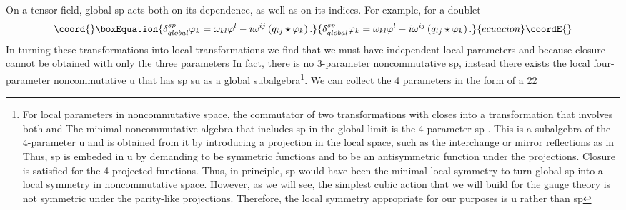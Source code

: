 \documentclass[a4paper,12pt]{article}
\begin{document}
On a tensor field, global sp\coordHE{} acts both on its \coordHE{} dependence, as well as on its indices. For
example, for a doublet 
\begin{equation}\coord{}\boxEquation{
\delta _{global}^{sp}\varphi _{k}=\omega _{kl}\varphi ^{l}-i\omega
^{ij}\left( q_{ij}\star \varphi _{k}\right) .
}{
\delta _{global}^{sp}\varphi _{k}=\omega _{kl}\varphi ^{l}-i\omega
^{ij}\left( q_{ij}\star \varphi _{k}\right) .
}{ecuacion}\coordE{}\end{equation}
In turning these transformations into local transformations we find that we
must have independent local parameters \coordHE{} and \coordHE{} because
closure cannot be obtained with only the three parameters \coordHE{} In fact, there is no 3-parameter
noncommutative sp\coordHE{}, instead there exists the local
four-parameter noncommutative u\coordHE{} that has sp\coordHE{} su\coordHE{} as a global subalgebra\footnote{%
For local parameters in noncommutative space, the commutator of two
transformations with \coordHE{} closes into a transformation that
involves both \coordHE{} and \coordHE{} The minimal noncommutative
algebra that includes sp\coordHE{} in the global limit is the
4-parameter sp\coordHE{} \cite{ncOn}. This is a
subalgebra of the 4-parameter u\coordHE{} and is obtained
from it by introducing a projection in the local space, such as the
interchange \coordHE{}  \myHighlight{$\rightleftharpoons $}\coordHE{}  \coordHE{} or mirror reflections \coordHE{} as in \cite{ncOn}\coordHE{} Thus, sp\coordHE{} is embeded in u\coordHE{} by demanding \coordHE{} to be symmetric functions and \coordHE{} to be an antisymmetric function under
the projections. Closure is satisfied for the 4 projected functions. Thus,
in principle, sp\coordHE{} would have been the minimal
local symmetry to turn global sp\coordHE{} into a local symmetry
in noncommutative space. However, as we will see, the simplest cubic action
that we will build for the gauge theory is not symmetric under the
parity-like projections. Therefore, the local symmetry appropriate for our
purposes is u\coordHE{} rather than sp\coordHE{}}. We can collect the 4 parameters in the form of a 2\myHighlight{$\times $}\coordHE{}2
\end{document}
